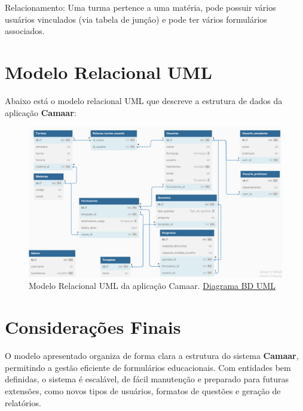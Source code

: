 \documentclass[a4paper,12pt]{article}
\begin{document}
Relacionamento: Uma turma pertence a uma matéria, pode possuir vários usuários vinculados (via tabela de junção) e pode ter vários formulários associados.


\section*{Modelo Relacional UML}
 
Abaixo está o modelo relacional UML que descreve a estrutura de dados da aplicação \textbf{Camaar}:
 
\begin{figure}[h!]

    \centering
    
    \includegraphics[width=1\textwidth]{./Imagens/Diagrama_de_Classes.png}

    \caption{Modelo Relacional UML da aplicação Camaar. \href{https://dbdiagram.io/d/Diagrama-BD-Eng-Software-6862ccc5f413ba350893b624}{Diagrama BD UML}}

    \label{fig:uml}

\end{figure}

\section*{Considerações Finais}

O modelo apresentado organiza de forma clara a estrutura do sistema \textbf{Camaar}, permitindo a gestão eficiente de formulários educacionais. Com entidades bem definidas, o sistema é escalável, de fácil manutenção e preparado para futuras extensões, como novos tipos de usuários, formatos de questões e geração de relatórios.
 
\end{document}
